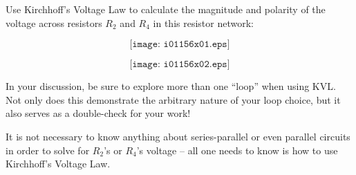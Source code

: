

Use Kirchhoff's Voltage Law to calculate the magnitude and polarity of the voltage across resistors $R_2$ and $R_4$ in this resistor network:

$$\texttt{[image: i01156x01.eps]}$$







$$\texttt{[image: i01156x02.eps]}$$







In your discussion, be sure to explore more than one ``loop'' when using KVL.  Not only does this demonstrate the arbitrary nature of your loop choice, but it also serves as a double-check for your work!

It is not necessary to know anything about series-parallel or even parallel circuits in order to solve for $R_2$'s or $R_4$'s voltage -- all one needs to know is how to use Kirchhoff's Voltage Law.




